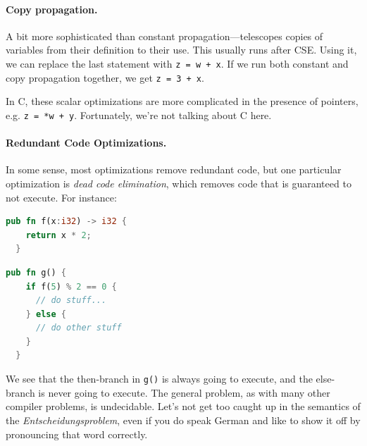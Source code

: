\documentclass[a4paper]{report}
\begin{document}
\paragraph{Copy propagation.} A bit more sophisticated than constant
propagation---telescopes copies of variables from their definition to
their use. This usually runs after CSE. Using it, we can replace the
last statement with {\tt z = w + x}. If we run both constant and copy
propagation together, we get {\tt z = 3 + x}.

In C, these scalar optimizations are more complicated in the presence
of pointers, e.g. {\tt z = *w + y}. Fortunately, we're not talking about C here.


\paragraph{Redundant Code Optimizations.} In some sense, most optimizations
remove redundant code, but one particular optimization is \emph{dead code
elimination}, which removes code that is guaranteed to not execute.
For instance:

{\scriptsize
\begin{center}
\vspace*{-2em}
\begin{minipage}{.3\textwidth}
\begin{lstlisting}[language=Rust]
  pub fn f(x:i32) -> i32 {
    return x * 2;
  }
  \end{lstlisting}
  \end{minipage} \begin{minipage}{.3\textwidth}
\begin{lstlisting}[language=Rust]
  pub fn g() {
    if f(5) % 2 == 0 {
      // do stuff...
    } else {
      // do other stuff
    }
  }
\end{lstlisting}
\end{minipage}
\end{center}
}
We see that the then-branch in {\tt g()} is always going to execute, and the
else-branch is never going to execute.
The general problem, as with many other compiler problems, is undecidable. Let's not get too caught up in the semantics of the \textit{Entscheidungsproblem}, even if you do speak German and like to show it off by pronouncing that word correctly.
\end{document}
